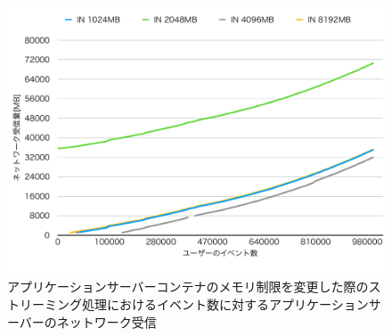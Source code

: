 \documentclass[../../../../../main]{subfiles}
\begin{document}
    \begin{figure}[H]
        \centering
        \includegraphics[width=12cm]{graph}
        \caption{アプリケーションサーバーコンテナのメモリ制限を変更した際のストリーミング処理におけるイベント数に対するアプリケーションサーバーのネットワーク受信}
        \label{fig:stream-change-app-memory-limit-app-net-in-app_4_db_1_1024}
    \end{figure}
\end{document}
